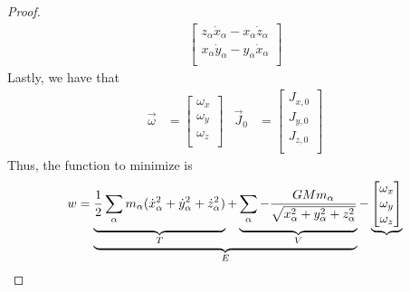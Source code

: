 \documentclass[../psets.tex]{subfiles}
\begin{document}
\begin{enumerate}
\begin{proof}
\begin{align*}
\begin{bmatrix}
                z_\alpha\dot{x}_\alpha-x_\alpha\dot{z}_\alpha\\
                x_\alpha\dot{y}_\alpha-y_\alpha\dot{x}_\alpha\\
            \end{bmatrix}
        \end{align*}
        Lastly, we have that
        \begin{align*}
            \vec{\omega} &=
            \begin{bmatrix}
                \omega_x\\
                \omega_y\\
                \omega_z\\
            \end{bmatrix}&
            \vec{J}_0 &=
            \begin{bmatrix}
                J_{x,0}\\
                J_{y,0}\\
                J_{z,0}\\
            \end{bmatrix}
        \end{align*}
        Thus, the function to minimize is
        \begin{equation*}
            w = \underbrace{\underbrace{\frac{1}{2}\sum_\alpha m_\alpha(\dot{x}_\alpha^2+\dot{y}_\alpha^2+\dot{z}_\alpha^2)\vphantom{
                \begin{bmatrix}
                    \omega_x\\
                    \omega_y\\
                    \omega_z\\
                \end{bmatrix}
            }}_T+\underbrace{\sum_\alpha -\frac{GMm_\alpha}{\sqrt{x_\alpha^2+y_\alpha^2+z_\alpha^2}}\vphantom{
                \begin{bmatrix}
                    \omega_x\\
                    \omega_y\\
                    \omega_z\\
                \end{bmatrix}
            }}_V}_E-\underbrace{
                \begin{bmatrix}
                    \omega_x\\
                    \omega_y\\
                    \omega_z\\
                \end{bmatrix}
}
\end{equation*}
\end{proof}
\end{enumerate}
\end{document}
